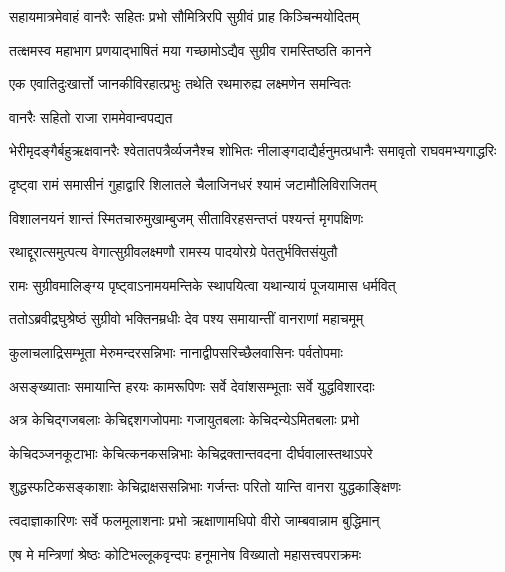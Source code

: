 \twolineshloka
{सहायमात्रमेवाहं वानरैः सहितः प्रभो}
{सौमित्रिरपि सुग्रीवं प्राह किञ्चिन्मयोदितम्} %

\twolineshloka
{तत्क्षमस्व महाभाग प्रणयाद्भाषितं मया}
{गच्छामोऽद्यैव सुग्रीव रामस्तिष्ठति कानने} %

\twolineshloka
{एक एवातिदुःखार्त्तो जानकीविरहात्प्रभुः}
{तथेति रथमारुह्य लक्ष्मणेन समन्वितः} %

\onelineshloka
{वानरैः सहितो राजा राममेवान्वपद्यत} %

\twolineshloka
{भेरीमृदङ्गैर्बहुऋक्षवानरैः श्वेतातपत्रैर्व्यजनैश्च शोभितः}
{नीलाङ्गदाद्यैर्हनुमत्प्रधानैः समावृतो राघवमभ्यगाद्धरिः} %





\twolineshloka
{दृष्ट्वा रामं समासीनं गुहाद्वारि शिलातले}
{चैलाजिनधरं श्यामं जटामौलिविराजितम्} %

\twolineshloka
{विशालनयनं शान्तं स्मितचारुमुखाम्बुजम्}
{सीताविरहसन्तप्तं पश्यन्तं मृगपक्षिणः} %

\twolineshloka
{रथाद्दूरात्समुत्पत्य वेगात्सुग्रीवलक्ष्मणौ}
{रामस्य पादयोरग्रे पेततुर्भक्तिसंयुतौ} %

\twolineshloka
{रामः सुग्रीवमालिङ्ग्य पृष्ट्वाऽनामयमन्तिके}
{स्थापयित्वा यथान्यायं पूजयामास धर्मवित्} %

\twolineshloka
{ततोऽब्रवीद्रघुश्रेष्ठं सुग्रीवो भक्तिनम्रधीः}
{देव पश्य समायान्तीं वानराणां महाचमूम्} %

\twolineshloka
{कुलाचलाद्रिसम्भूता मेरुमन्दरसन्निभाः}
{नानाद्वीपसरिच्छैलवासिनः पर्वतोपमाः} %

\twolineshloka
{असङ्ख्याताः समायान्ति हरयः कामरूपिणः}
{सर्वे देवांशसम्भूताः सर्वे युद्धविशारदाः} %

\twolineshloka
{अत्र केचिद्गजबलाः केचिद्दशगजोपमाः}
{गजायुतबलाः केचिदन्येऽमितबलाः प्रभो} %

\twolineshloka
{केचिदञ्जनकूटाभाः केचित्कनकसन्निभाः}
{केचिद्रक्तान्तवदना दीर्घवालास्तथाऽपरे} %

\twolineshloka
{शुद्धस्फटिकसङ्काशाः केचिद्राक्षससन्निभाः}
{गर्जन्तः परितो यान्ति वानरा युद्धकाङ्क्षिणः} %

\twolineshloka
{त्वदाज्ञाकारिणः सर्वे फलमूलाशनाः प्रभो}
{ऋक्षाणामधिपो वीरो जाम्बवान्नाम बुद्धिमान्} %

\twolineshloka
{एष मे मन्त्रिणां श्रेष्ठः कोटिभल्लूकवृन्दपः}
{हनूमानेष विख्यातो महासत्त्वपराक्रमः} %

